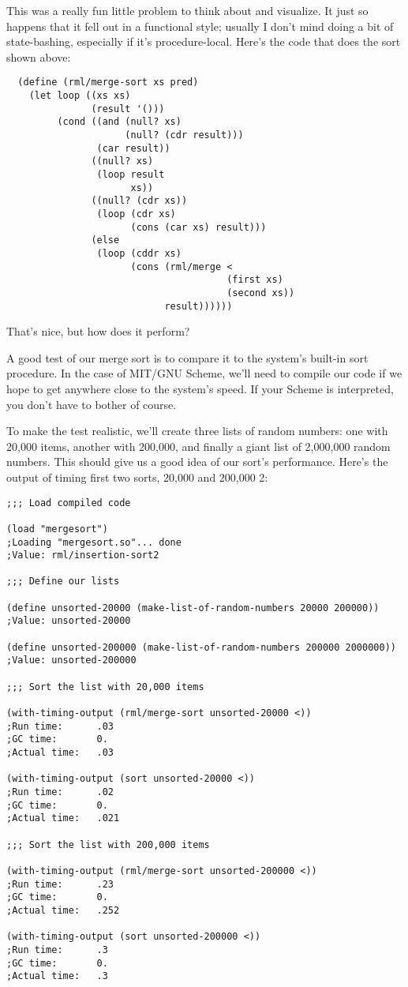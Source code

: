 \documentclass[12pt,openright,draft]{book}
\begin{document}
This was a really fun little problem to think about and visualize. It
just so happens that it fell out in a functional style; usually I
don't mind doing a bit of state-bashing, especially if it's
procedure-local. Here's the code that does the sort shown above:

\begin{verbatim}
  (define (rml/merge-sort xs pred)
    (let loop ((xs xs)
               (result '()))
         (cond ((and (null? xs)
                     (null? (cdr result)))
                (car result))
               ((null? xs)
                (loop result
                      xs))
               ((null? (cdr xs))
                (loop (cdr xs)
                      (cons (car xs) result)))
               (else
                (loop (cddr xs)
                      (cons (rml/merge <
                                       (first xs)
                                       (second xs))
                            result))))))
\end{verbatim}

That's nice, but how does it perform?

A good test of our merge sort is to compare it to the system's
built-in sort procedure. In the case of MIT/GNU Scheme, we'll need to
compile our code if we hope to get anywhere close to the system's
speed. If your Scheme is interpreted, you don't have to bother of
course.

To make the test realistic, we'll create three lists of random
numbers: one with 20,000 items, another with 200,000, and finally a
giant list of 2,000,000 random numbers. This should give us a good
idea of our sort's performance. Here's the output of timing first two
sorts, 20,000 and 200,000 2:

\begin{verbatim}
;;; Load compiled code

(load "mergesort")
;Loading "mergesort.so"... done
;Value: rml/insertion-sort2

;;; Define our lists

(define unsorted-20000 (make-list-of-random-numbers 20000 200000))
;Value: unsorted-20000

(define unsorted-200000 (make-list-of-random-numbers 200000 2000000))
;Value: unsorted-200000

;;; Sort the list with 20,000 items

(with-timing-output (rml/merge-sort unsorted-20000 <))
;Run time:      .03
;GC time:       0.
;Actual time:   .03

(with-timing-output (sort unsorted-20000 <))
;Run time:      .02
;GC time:       0.
;Actual time:   .021

;;; Sort the list with 200,000 items

(with-timing-output (rml/merge-sort unsorted-200000 <))
;Run time:      .23
;GC time:       0.
;Actual time:   .252

(with-timing-output (sort unsorted-200000 <))
;Run time:      .3
;GC time:       0.
;Actual time:   .3
\end{verbatim}
\end{document}
